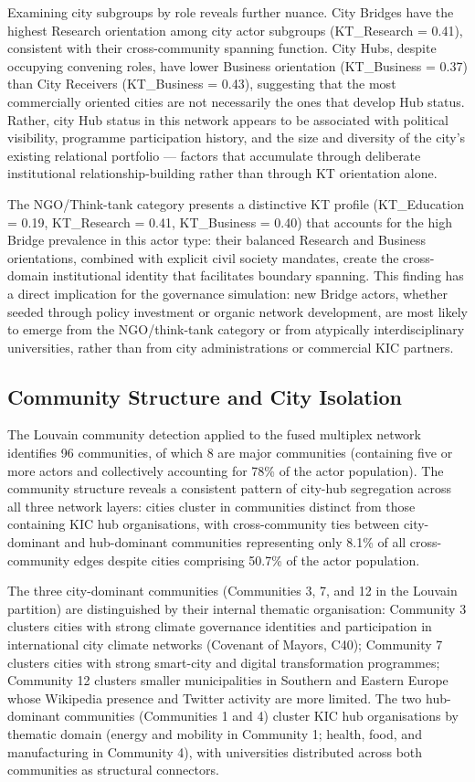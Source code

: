 \documentclass[review,12pt]{elsarticle}
\begin{document}
Examining city subgroups by role reveals further nuance. City Bridges have the highest Research orientation among city actor subgroups (KT\_Research = 0.41), consistent with their cross-community spanning function. City Hubs, despite occupying convening roles, have lower Business orientation (KT\_Business = 0.37) than City Receivers (KT\_Business = 0.43), suggesting that the most commercially oriented cities are not necessarily the ones that develop Hub status. Rather, city Hub status in this network appears to be associated with political visibility, programme participation history, and the size and diversity of the city's existing relational portfolio --- factors that accumulate through deliberate institutional relationship-building rather than through KT orientation alone.

The NGO/Think-tank category presents a distinctive KT profile (KT\_Education = 0.19, KT\_Research = 0.41, KT\_Business = 0.40) that accounts for the high Bridge prevalence in this actor type: their balanced Research and Business orientations, combined with explicit civil society mandates, create the cross-domain institutional identity that facilitates boundary spanning. This finding has a direct implication for the governance simulation: new Bridge actors, whether seeded through policy investment or organic network development, are most likely to emerge from the NGO/think-tank category or from atypically interdisciplinary universities, rather than from city administrations or commercial KIC partners.

\subsection{Community Structure and City Isolation}

The Louvain community detection applied to the fused multiplex network identifies 96 communities, of which 8 are major communities (containing five or more actors and collectively accounting for 78\% of the actor population). The community structure reveals a consistent pattern of city-hub segregation across all three network layers: cities cluster in communities distinct from those containing KIC hub organisations, with cross-community ties between city-dominant and hub-dominant communities representing only 8.1\% of all cross-community edges despite cities comprising 50.7\% of the actor population.

The three city-dominant communities (Communities 3, 7, and 12 in the Louvain partition) are distinguished by their internal thematic organisation: Community 3 clusters cities with strong climate governance identities and participation in international city climate networks (Covenant of Mayors, C40); Community 7 clusters cities with strong smart-city and digital transformation programmes; Community 12 clusters smaller municipalities in Southern and Eastern Europe whose Wikipedia presence and Twitter activity are more limited. The two hub-dominant communities (Communities 1 and 4) cluster KIC hub organisations by thematic domain (energy and mobility in Community 1; health, food, and manufacturing in Community 4), with universities distributed across both communities as structural connectors.
\end{document}
